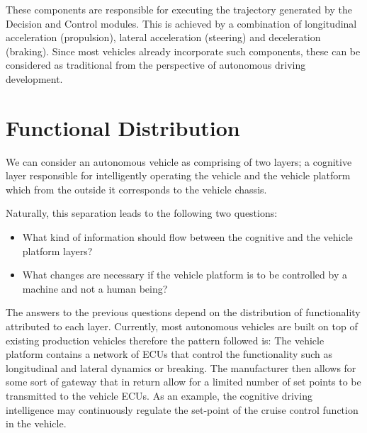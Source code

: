 These components are responsible for executing the trajectory generated by the Decision and Control modules. This is achieved by a combination of longitudinal acceleration (propulsion), lateral acceleration  (steering) and deceleration (braking). Since most vehicles already incorporate such components, these can be considered as traditional from the perspective of autonomous driving development.


\section{Functional Distribution}

We can consider an autonomous vehicle as comprising of two layers; a cognitive 
layer responsible for intelligently operating the vehicle and the vehicle platform which from the outside it corresponds to the vehicle chassis. 

Naturally, this separation leads to the following two questions:

\begin{itemize}
\item What kind of information should flow between the cognitive and the vehicle platform layers?
\item What changes are necessary if the vehicle platform is to be controlled by a machine and not a human being?
\end{itemize}

The answers to the previous questions depend on the distribution of functionality attributed to each layer. Currently, most autonomous vehicles are built on top of existing production vehicles therefore the pattern followed is: The vehicle platform
contains a network of ECUs that control the functionality such as longitudinal and lateral dynamics or breaking. The manufacturer then allows for some sort of gateway that in return allow for a limited number of set points to be transmitted to the vehicle ECUs.  As an example, the cognitive driving intelligence may continuously regulate the set-point of the cruise control function in the vehicle.

